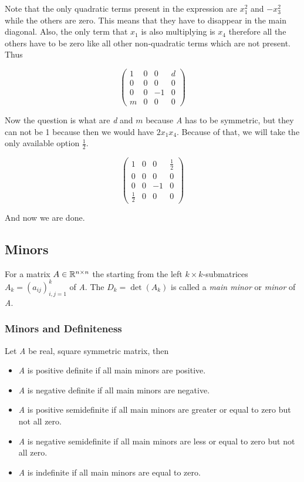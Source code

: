 Note that the only quadratic terms present in the expression are \(x_{1}^{2}\) and \(-x_{3}^{2}\) while the 
others are zero. This means that they have to disappear in the main diagonal. Also, the only term 
that \(x_1\) is also multiplying is \(x_4\) therefore all the others have to be zero like all 
other non-quadratic terms which are not present. Thus 

\[
    \begin{pmatrix}
        1 & 0 & 0 & d \\
        0 & 0 & 0 & 0 \\
        0 & 0 & -1 & 0 \\
        m & 0 & 0 & 0  
    \end{pmatrix}
\]

Now the question is what are \emph{d} and \(m\) because \emph{A} has to be symmetric, but they can not be 1 
because then we would have \(2x_1 x_4\). Because of that, we will take the only available option 
\(\frac{1}{2}\).

\[
    \begin{pmatrix}
        1 & 0 & 0 & \frac{1}{2} \\
        0 & 0 & 0 & 0 \\
        0 & 0 & -1 & 0 \\
        \frac{1}{2} & 0 & 0 & 0  
    \end{pmatrix}
\]

And now we are done.

\subsection{Minors}

For a matrix \(A \in \mathbb{R}^{n \times n}\) the starting from the left \(k \times k\)-submatrices 
\(A_k = (a_{ij})_{i,j=1}^{k}\) of \emph{A}. The \(D_k  = \det(A_k)\) is called a \emph{main minor} or 
\emph{minor} of \emph{A}.

\subsubsection{Minors and Definiteness}

Let \emph{A} be real, square symmetric matrix, then

\begin{itemize}
    
    \item \emph{A} is positive definite if all main minors are positive.

    \item \emph{A} is negative definite if all main minors are negative.

    \item \emph{A} is positive semidefinite if all main minors are greater or equal to zero but not all zero. 

    \item \emph{A} is negative semidefinite if all main minors are less or equal to zero but not all zero.

    \item \emph{A} is indefinite if all main minors are equal to zero.

\end{itemize}

